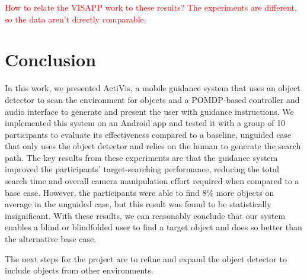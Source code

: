 \documentclass[runningheads]{llncs}
\newcommand\todo[1]{\textcolor{red}{#1}}
\begin{document}
\todo{How to relate the VISAPP work to these results? The experiments are different, so the data aren't directly comparable.}

\section{Conclusion}\label{sec:conclusion}

In this work, we presented ActiVis, a mobile guidance system that uses an object detector to scan the environment for objects and a POMDP-based controller and audio interface to generate and present the user with guidance instructions. 
We implemented this system on an Android app and tested it with a group of 10 participants to evaluate its effectiveness compared to a baseline, unguided case that only uses the object detector and relies on the human to generate the search path. 
The key results from these experiments are that the guidance system improved the participants' target-searching performance, reducing the total search time and overall camera manipulation effort required when compared to a base case.
However, the participants were able to find 8\% more objects on average in the unguided case, but this result was found to be statistically insignificant. 
With these results, we can reasonably conclude that our system enables a blind or blindfolded user to find a target object and does so better than the alternative base case.

The next steps for the project are to refine and expand the object detector to include objects from other environments. 



\end{document}
